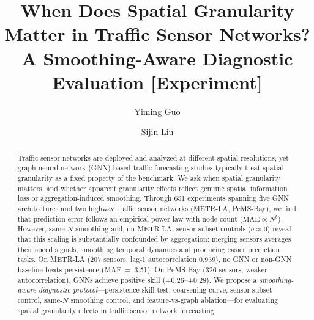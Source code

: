 \documentclass[sigconf]{acmart}
\begin{document}
\title{When Does Spatial Granularity Matter in Traffic Sensor Networks?\\A Smoothing-Aware Diagnostic Evaluation [Experiment]}

\author{Yiming Guo}

\author{Sijin Liu}

\begin{abstract}
Traffic sensor networks are deployed and analyzed at different spatial resolutions, yet graph neural network (GNN)-based traffic forecasting studies typically treat spatial granularity as a fixed property of the benchmark. We ask when spatial granularity matters, and whether apparent granularity effects reflect genuine spatial information loss or aggregation-induced smoothing. Through 651 experiments spanning five GNN architectures and two highway traffic sensor networks (METR-LA, PeMS-Bay), we find that prediction error follows an empirical power law with node count ($\text{MAE} \propto N^b$). However, same-$N$ smoothing and, on METR-LA, sensor-subset controls ($b \approx 0$) reveal that this scaling is substantially confounded by aggregation: merging sensors averages their speed signals, smoothing temporal dynamics and producing easier prediction tasks. On METR-LA (207 sensors, lag-1 autocorrelation 0.939), no GNN or non-GNN baseline beats persistence (MAE~=~3.51). On PeMS-Bay (326 sensors, weaker autocorrelation), GNNs achieve positive skill ($+0.26$--$+0.28$). We propose a \textit{smoothing-aware diagnostic protocol}---persistence skill test, coarsening curve, sensor-subset control, same-$N$ smoothing control, and feature-vs-graph ablation---for evaluating spatial granularity effects in traffic sensor network forecasting.
\end{abstract}

\maketitle

\end{document}
